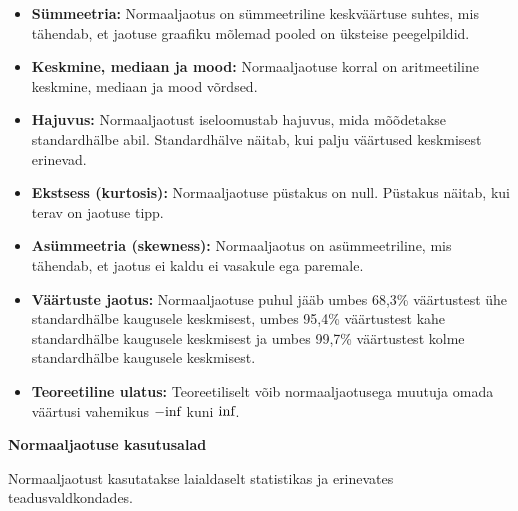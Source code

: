 \documentclass[
]{book}
\providecommand{\tightlist}{%
  \setlength{\itemsep}{0pt}\setlength{\parskip}{0pt}}
\begin{document}
\begin{itemize}
\tightlist
\item
  \textbf{Sümmeetria:} Normaaljaotus on sümmeetriline keskväärtuse suhtes, mis tähendab, et jaotuse graafiku mõlemad pooled on üksteise peegelpildid.
\item
  \textbf{Keskmine, mediaan ja mood:} Normaaljaotuse korral on aritmeetiline keskmine, mediaan ja mood võrdsed.
\item
  \textbf{Hajuvus:} Normaaljaotust iseloomustab hajuvus, mida mõõdetakse standardhälbe abil. Standardhälve näitab, kui palju väärtused keskmisest erinevad.
\item
  \textbf{Ekstsess (kurtosis):} Normaaljaotuse püstakus on null. Püstakus näitab, kui terav on jaotuse tipp.
\item
  \textbf{Asümmeetria (skewness):} Normaaljaotus on asümmeetriline, mis tähendab, et jaotus ei kaldu ei vasakule ega paremale.
\item
  \textbf{Väärtuste jaotus:} Normaaljaotuse puhul jääb umbes 68,3\% väärtustest ühe standardhälbe kaugusele keskmisest, umbes 95,4\% väärtustest kahe standardhälbe kaugusele keskmisest ja umbes 99,7\% väärtustest kolme standardhälbe kaugusele keskmisest.
\item
  \textbf{Teoreetiline ulatus:} Teoreetiliselt võib normaaljaotusega muutuja omada väärtusi vahemikus \(-$inf$\) kuni \($inf$\).
\end{itemize}

\textbf{Normaaljaotuse kasutusalad}

Normaaljaotust kasutatakse laialdaselt statistikas ja erinevates teadusvaldkondades.
\end{document}
